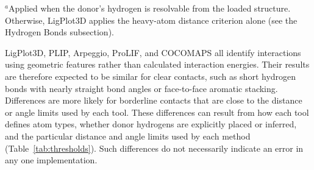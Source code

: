\documentclass[journal=jacsat,manuscript=article]{achemso}
\begin{document}
\begin{table}[H]
\centering
\caption{LigPlot3D geometric thresholds compared with PLIP's default configuration \cite{salentin2015plip,schake2025plip}. The two tools are independently parameterized and their thresholds are not intended to be identical.}
\label{tab:thresholds}

\footnotesize $^{a}$Applied when the donor's hydrogen is resolvable from the loaded structure. Otherwise, LigPlot3D applies the heavy-atom distance criterion alone (see the Hydrogen Bonds subsection).
\end{table}

LigPlot3D, PLIP, Arpeggio, ProLIF, and COCOMAPS all identify interactions using geometric features rather than calculated interaction energies. Their results are therefore expected to be similar for clear contacts, such as short hydrogen bonds with nearly straight bond angles or face-to-face aromatic stacking. Differences are more likely for borderline contacts that are close to the distance or angle limits used by each tool. These differences can result from how each tool defines atom types, whether donor hydrogens are explicitly placed or inferred, and the particular distance and angle limits used by each method (Table~\ref{tab:thresholds}). Such differences do not necessarily indicate an error in any one implementation.
\end{document}
